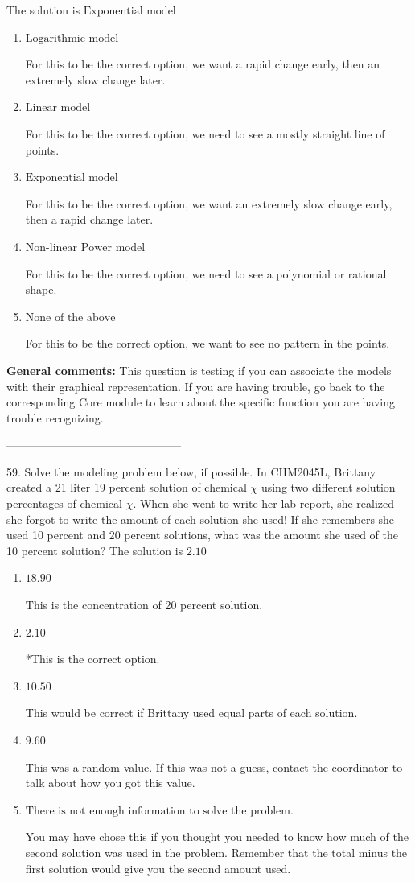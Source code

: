 \documentclass{extbook}[14pt]
\begin{document}
The solution is $ \text{Exponential model} $ 

\begin{enumerate}[label=\Alph*.] 
\item $ \text{Logarithmic model} $ 

 For this to be the correct option, we want a rapid change early, then an extremely slow change later. 
\item $ \text{Linear model} $ 

 For this to be the correct option, we need to see a mostly straight line of points. 
\item $ \text{Exponential model} $ 

 For this to be the correct option, we want an extremely slow change early, then a rapid change later. 
\item $ \text{Non-linear Power model} $ 

 For this to be the correct option, we need to see a polynomial or rational shape. 
\item $ \text{None of the above} $ 

 For this to be the correct option, we want to see no pattern in the points. 
\end{enumerate} 
 
\textbf{General comments:} This question is testing if you can associate the models with their graphical representation. If you are having trouble, go back to the corresponding Core module to learn about the specific function you are having trouble recognizing.

-----------------------------------------------

59. Solve the modeling problem below, if possible.
In CHM2045L, Brittany created a 21 liter 19 percent solution of chemical $\chi$ using two different solution percentages of chemical $\chi$. When she went to write her lab report, she realized she forgot to write the amount of each solution she used! If she remembers she used 10 percent and 20 percent solutions, what was the amount she used of the 10 percent solution? 
The solution is $ 2.10 $ 

\begin{enumerate}[label=\Alph*.] 
\item $ 18.90 $ 

 This is the concentration of 20 percent solution. 
\item $ 2.10 $ 

 *This is the correct option. 
\item $ 10.50 $ 

 This would be correct if Brittany used equal parts of each solution. 
\item $ 9.60 $ 

 This was a random value. If this was not a guess, contact the coordinator to talk about how you got this value. 
\item $ \text{There is not enough information to solve the problem.} $ 

 You may have chose this if you thought you needed to know how much of the second solution was used in the problem. Remember that the total minus the first solution would give you the second amount used. 
\end{enumerate} 
 
\end{document}
